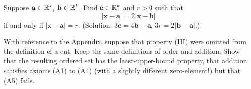 \begin{myExercise}
    \label{ex:1.19}
    Suppose $\mathbf{a} \in {\protect\mathbb R}^k$, $\mathbf{b} \in{\protect\mathbb R}^k$. Find $\mathbf{c} \in {\protect\mathbb R}^k$ and $r > 0$ such that
    \begin{equation*}
        |\mathbf{x} - \mathbf{a}| = 2|\mathbf{x} - \mathbf{b}|
    \end{equation*}
    if and only if $|\mathbf{x} - \mathbf{a}| = r$.
    (Solution: $3\mathbf{c} =4\mathbf{b}-\mathbf{a}$, $3r =2|\mathbf{b}-\mathbf{a}|$.)
\end{myExercise}

\begin{myExercise}
    \label{ex:1.20}
    With reference to the Appendix, suppose that property (III) were omitted from the
    definition of a cut. Keep the same definitions of order and addition. Show that
    the resulting ordered set has the least-upper-bound property, that addition satisfies
    axioms (A1) to (A4) (with a slightly different zero-element!) but that (A5) fails.
\end{myExercise}
